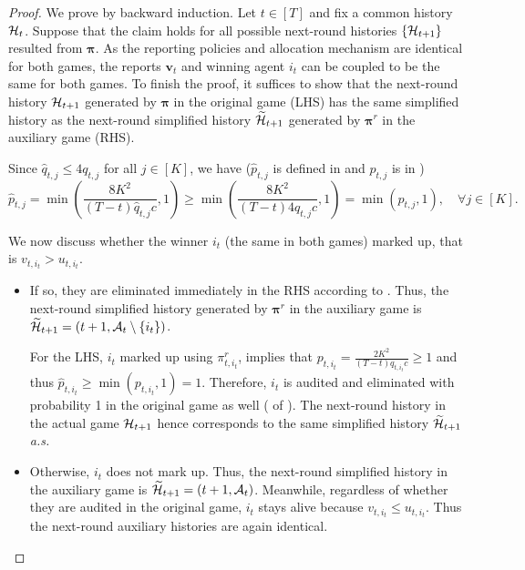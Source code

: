 \begin{proof}
We prove by backward induction. Let $t\in[T]$ and fix a common history $\mathcal{H}_t$. Suppose that the claim holds for all possible next-round histories $\{\mathcal{H}_{t+1}\}$ resulted from $\bm \pi$.
As the reporting policies and allocation mechanism are identical for both games, the reports $\bm v_t$ and winning agent $i_t$ can be coupled to be the same for both games.
To finish the proof, it suffices to show that the next-round history $\mathcal{H}_{t+1}$ generated by $\bm \pi$ in the original game (LHS) has the same simplified history as the next-round simplified history $\widetilde{\mathcal{H}}_{t+1}$ generated by ${\bm \pi}^r$ in the auxiliary game (RHS).

Since $\hat q_{t,j}\le 4q_{t,j}$ for all $j\in [K]$, we have ($\hat p_{t,j}$ is defined in  and $p_{t,j}$ is in )
\begin{equation*}
\hat p_{t,j}=\min\left (\frac{8K^2}{(T-t) \hat q_{t,j} c},1\right )\ge \min\left (\frac{8K^2}{(T-t) 4 q_{t,j} c},1\right )=\min(p_{t,j},1),\quad \forall j\in [K].
\end{equation*}

We now discuss whether the winner $i_t$ (the same in both games) marked up, that is $v_{t,i_t}>u_{t,i_t}$.
\begin{itemize}
\item If so, they are eliminated immediately in the RHS according to . Thus, the next-round simplified history generated by ${\bm \pi}^r$ in the auxiliary game is $\widetilde {\mathcal{H}}_{t+1}=(t+1,\mathcal{A}_t\setminus \{i_t\})$.

For the LHS, $i_t$ marked up using $\pi^r_{t,i_t}$,  implies that $p_{t,i_t}=\frac{2K^2}{(T-t) q_{t,i_t} c}\ge 1$ and thus $\hat p_{t,i_t}\ge \min(p_{t,i_t},1)=1$. Therefore, $i_t$ is audited and eliminated with probability 1 in the original game as well ( of ). The next-round history in the actual game $\mathcal{H}_{t+1}$ hence corresponds to the same simplified history $\widetilde {\mathcal{H}}_{t+1}$ \textit{a.s.}
\item Otherwise, $i_t$ does not mark up. Thus, the next-round simplified history in the auxiliary game is $\widetilde{\mathcal{H}}_{t+1}=(t+1,\mathcal{A}_t)$. Meanwhile, regardless of whether they are audited in the original game, $i_t$ stays alive because $v_{t,i_t}\le u_{t,i_t}$. Thus the next-round auxiliary histories are again identical.
\end{itemize}


\end{proof}

